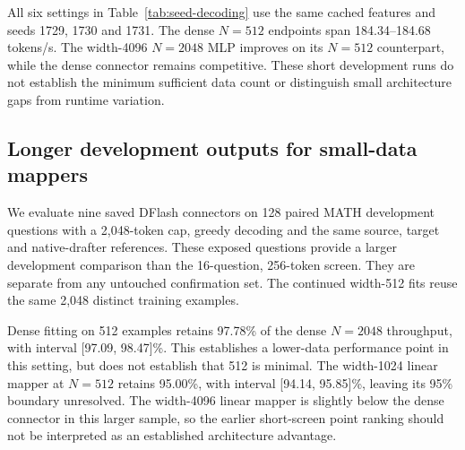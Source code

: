 \documentclass{article}
\begin{document}
\begin{table}[H]
\caption{Observed throughput ranges across three fitting seeds in a
separate 16-question, 256-token development campaign. Selected uses each
fit's minimum saved feature-validation checkpoint. These ranges describe
the three measured fits and runtime variation, not confidence intervals.}
\label{tab:seed-decoding}
\centering\footnotesize
\setlength{\tabcolsep}{4pt}

\end{table}

All six settings in Table~\ref{tab:seed-decoding} use the same cached
features and seeds 1729, 1730 and 1731. The dense $N=512$ endpoints
span 184.34--184.68 tokens/s. The width-4096 $N=2048$ MLP improves on its
$N=512$ counterpart, while the dense connector remains competitive.
These short development runs do not establish the minimum sufficient
data count or distinguish small architecture gaps from runtime variation.

\clearpage
\subsection{Longer development outputs for small-data mappers}

We evaluate nine saved DFlash connectors on 128 paired MATH development
questions with a 2,048-token cap, greedy decoding and the same source,
target and native-drafter references. These exposed questions provide a
larger development comparison than the 16-question, 256-token screen.
They are separate from any untouched confirmation set. The continued
width-512 fits reuse the same 2,048 distinct training examples.

\begin{table}[H]
\caption{Capped development outcomes for small-data DFlash fitting.
Throughput retention uses the dense $N=2048$, 8,192-update connector.
Intervals use 10,000 paired request bootstrap samples. Correct counts
scored answers. Cap counts outputs reaching 2,048 tokens, which can include
EOS exactly at the limit and are not exact truncation counts.}
\label{tab:small-quality}
\centering\footnotesize
\setlength{\tabcolsep}{3pt}

\end{table}

Dense fitting on 512 examples retains 97.78\% of the dense $N=2048$
throughput, with interval [97.09, 98.47]\%. This establishes a lower-data
performance point in this setting, but does not establish that 512 is
minimal. The width-1024 linear mapper at $N=512$ retains 95.00\%, with
interval [94.14, 95.85]\%, leaving its 95\% boundary unresolved.
The width-4096 linear mapper is slightly below the dense connector in
this larger sample, so the earlier short-screen point ranking should
not be interpreted as an established architecture advantage.
\end{document}

